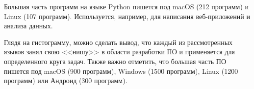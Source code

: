 Большая часть программ на языке Python пишется под macOS (212 программ) и Linux (107 программ). Используется, например, для написания веб-приложений и анализа данных.

Глядя на гистограмму, можно сделать вывод, что каждый из рассмотренных языков занял свою <<нишу>> в области разработки ПО и применяется для определенного круга задач. Также важно отметить, что большая часть ПО пишется под macOS (900 программ), Windows (1500 программ), Linux (1200 программ) или Андроид (300 программ).
